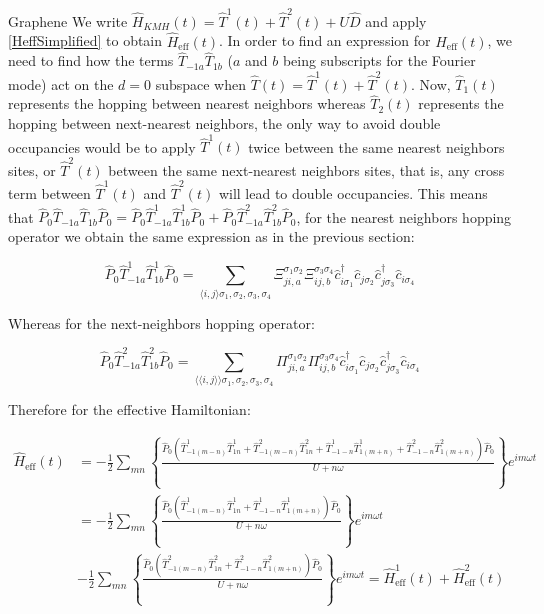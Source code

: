 \begin{section}{Graphene}
We write $\hat{H}_{KMH}(t) = \hat{T}^1(t) + \hat{T}^2(t) + U\hat{D}$ and apply \ref{HeffSimplified} to obtain $\hat{H}_{\text{eff}}(t)$. In order to find an expression for $\hat{H}_{\text{eff}}(t)$, we need to find how the terms $\hat{T}_{-1a}\hat{T}_{1b}$ ($a$ and $b$ being subscripts for the Fourier mode) act on the $d=0$ subspace when $\hat{T}(t) = \hat{T}^1(t) + \hat{T}^2(t)$. Now, $\hat{T}_1(t)$ represents the hopping between nearest neighbors whereas $\hat{T}_2(t)$ represents the hopping between next-nearest neighbors, the only way to avoid double occupancies would be to apply $\hat{T}^1(t)$ twice between the same nearest neighbors sites, or $\hat{T}^2(t)$ between the same next-nearest neighbors sites, that is, any cross term between $\hat{T}^1(t)$ and $\hat{T}^2(t)$ will lead to double occupancies. This means that $\hat{P}_0\hat{T}_{-1a}\hat{T}_{1b}\hat{P}_0 = \hat{P}_0\hat{T}_{-1a}^1\hat{T}_{1b}^1\hat{P}_0+\hat{P}_0\hat{T}_{-1a}^2\hat{T}_{1b}^2\hat{P}_0$, for the nearest neighbors hopping operator we obtain the same expression as in the previous section:

\begin{equation}
\hat{P}_0 \hat{T}_{-1a}^1\hat{T}_{1b}^1 \hat{P}_0 = \sum_{\langle i,j \rangle \sigma_1, \sigma_2, \sigma_3, \sigma_4} \Xi_{ji,a}^{\sigma_1\sigma_2}\Xi_{ij,b}^{\sigma_3\sigma_4} \hat{c}_{i\sigma_1}^\dagger\hat{c}_{j\sigma_2}\hat{c}_{j\sigma_3}^\dagger\hat{c}_{i\sigma_4}
\end{equation}

Whereas for the next-neighbors hopping operator:

\begin{equation}
\hat{P}_0 \hat{T}_{-1a}^2\hat{T}_{1b}^2 \hat{P}_0 = \sum_{\langle \langle i,j \rangle \rangle \sigma_1, \sigma_2, \sigma_3, \sigma_4} \Pi_{ji,a}^{\sigma_1\sigma_2}\Pi_{ij,b}^{\sigma_3\sigma_4} \hat{c}_{i\sigma_1}^\dagger\hat{c}_{j\sigma_2}\hat{c}_{j\sigma_3}^\dagger\hat{c}_{i\sigma_4}
\end{equation}

Therefore for the effective Hamiltonian:

\begin{align*}
\hat{H}_{\text{eff}}(t) &= -\frac{1}{2}\sum_{mn} \left\{ \frac{\hat{P}_0  (\hat{T}_{-1(m-n)}^1\hat{T}_{1n}^1 + \hat{T}_{-1(m-n)}^2\hat{T}_{1n}^2 + \hat{T}_{-1-n}^1\hat{T}_{1(m+n)}^1 + \hat{T}_{-1-n}^2\hat{T}_{1(m+n)}^2)\hat{P}_0}{U+n\omega} \right\} e^{im\omega t} \\
&= -\frac{1}{2}\sum_{mn} \left\{ \frac{\hat{P}_0  (\hat{T}_{-1(m-n)}^1\hat{T}_{1n}^1 + \hat{T}_{-1-n}^1\hat{T}_{1(m+n)}^1)\hat{P}_0}{U+n\omega} \right\} e^{im\omega t} \\
&-\frac{1}{2}\sum_{mn} \left\{ \frac{\hat{P}_0  (\hat{T}_{-1(m-n)}^2\hat{T}_{1n}^2 + \hat{T}_{-1-n}^2\hat{T}_{1(m+n)}^2)\hat{P}_0}{U+n\omega} \right\} e^{im\omega t} = \hat{H}_{\text{eff}}^1(t) + \hat{H}_{\text{eff}}^2(t)
\end{align*}


\end{section}

